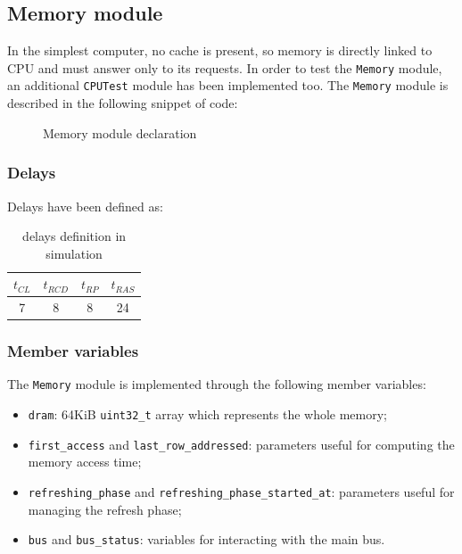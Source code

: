 \documentclass[a4paper,12pt]{article}
\begin{document}
\subsection{Memory module}
In the simplest computer, no cache is present, so memory is directly linked to CPU and must answer only to its requests.
In order to test the \texttt{Memory} module, an additional \texttt{CPUTest} module has been implemented too.
The \texttt{Memory} module is described in the following snippet of code:

\begin{figure}[H]

\caption{Memory module declaration}
\label{src:memory-h}
\end{figure}

\subsubsection{Delays}
Delays have been defined as:

\begin{table}[H]
\centering
\bgroup
\def\arraystretch{1.5}  %
\begin{tabular}{| c | c | c | c |}\hline
$t_{CL}$ & $t_{RCD}$ & $t_{RP}$ & $t_{RAS}$ \\ \hline
7 & 8 & 8 & 24 \\ \hline
\end{tabular}
\egroup
\caption{delays definition in simulation}
\end{table}

\subsubsection{Member variables}
The \texttt{Memory} module is implemented through the following member variables:

\begin{itemize}
    \item \texttt{dram}: 64KiB \texttt{uint32\_t} array which represents the whole memory;
    \item \texttt{first\_access} and \texttt{last\_row\_addressed}: parameters useful for computing the memory access time;
    \item \texttt{refreshing\_phase} and \texttt{refreshing\_phase\_started\_at}: parameters useful for managing the refresh phase;
    \item \texttt{bus} and \texttt{bus\_status}: variables for interacting with the main bus.
\end{itemize}
\end{document}
